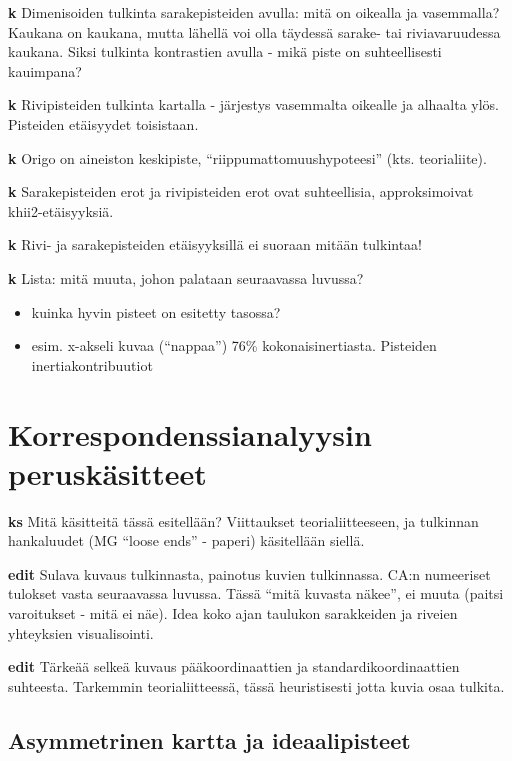 \documentclass[
  finnish,
]{book}
\providecommand{\tightlist}{%
  \setlength{\itemsep}{0pt}\setlength{\parskip}{0pt}}
\begin{document}
\textbf{k} Dimenisoiden tulkinta sarakepisteiden avulla: mitä on
oikealla ja vasemmalla? Kaukana on kaukana, mutta lähellä voi olla
täydessä sarake- tai riviavaruudessa kaukana. Siksi tulkinta kontrastien
avulla - mikä piste on suhteellisesti kauimpana?

\textbf{k} Rivipisteiden tulkinta kartalla - järjestys vasemmalta
oikealle ja alhaalta ylös. Pisteiden etäisyydet toisistaan.

\textbf{k} Origo on aineiston keskipiste, ``riippumattomuushypoteesi''
(kts. teorialiite).

\textbf{k} Sarakepisteiden erot ja rivipisteiden erot ovat suhteellisia,
approksimoivat khii2-etäisyyksiä.

\textbf{k} Rivi- ja sarakepisteiden etäisyyksillä ei suoraan mitään
tulkintaa!

\textbf{k} Lista: mitä muuta, johon palataan seuraavassa luvussa?

\begin{itemize}
\tightlist
\item
  kuinka hyvin pisteet on esitetty tasossa?
\item
  esim. x-akseli kuvaa (``nappaa'') 76\% kokonaisinertiasta. Pisteiden
  inertiakontribuutiot
\end{itemize}

\hypertarget{korrespondenssianalyysin-peruskuxe4sitteet}{%
\section{Korrespondenssianalyysin
peruskäsitteet}\label{korrespondenssianalyysin-peruskuxe4sitteet}}

\textbf{ks} Mitä käsitteitä tässä esitellään? Viittaukset
teorialiitteeseen, ja tulkinnan hankaluudet (MG ``loose ends'' - paperi)
käsitellään siellä.

\textbf{edit} Sulava kuvaus tulkinnasta, painotus kuvien tulkinnassa.
CA:n numeeriset tulokset vasta seuraavassa luvussa. Tässä ``mitä kuvasta
näkee'', ei muuta (paitsi varoitukset - mitä ei näe). Idea koko ajan
taulukon sarakkeiden ja riveien yhteyksien visualisointi.

\textbf{edit} Tärkeää selkeä kuvaus pääkoordinaattien ja
standardikoordinaattien suhteesta. Tarkemmin teorialiitteessä, tässä
heuristisesti jotta kuvia osaa tulkita.

\hypertarget{asymmetrinen-kartta-ja-ideaalipisteet}{%
\subsection{Asymmetrinen kartta ja
ideaalipisteet}\label{asymmetrinen-kartta-ja-ideaalipisteet}}
\end{document}
